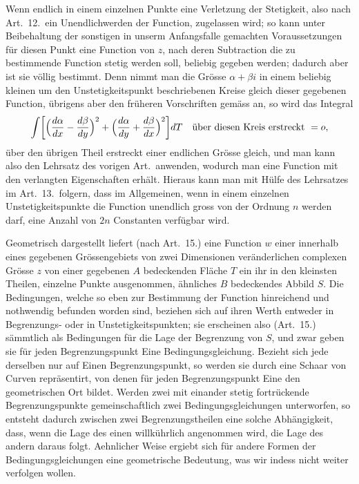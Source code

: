\documentclass{article}
\begin{document}
Wenn endlich in einem einzelnen Punkte eine Verletzung der Stetigkeit, also nach Art.~12.\ ein Unendlichwerden der Function, zugelassen wird; so kann unter Beibehaltung der sonstigen in unserm Anfangsfalle gemachten Voraussetzungen für diesen Punkt eine Function von $z$, nach deren Subtraction die zu bestimmende Function stetig werden soll, beliebig gegeben werden; dadurch aber ist sie völlig bestimmt. Denn nimmt man die Grösse $\alpha + \beta i$ in einem beliebig kleinen um den Unstetigkeitspunkt beschriebenen Kreise gleich dieser gegebenen Function, übrigens aber den früheren Vorschriften gemäss an, so wird das Integral
\[
\int \biggl[\Bigl(\frac{d\alpha}{dx} - \frac{d\beta}{dy}\Bigr)^2 + \Bigl(\frac{d\alpha}{dy} + \frac{d\beta}{dx}\Bigr)^2\biggr] dT \quad \text{über diesen Kreis erstreckt } = o,
\]
über den übrigen Theil erstreckt einer endlichen Grösse gleich, und man kann also den Lehrsatz des vorigen Art.\ anwenden, wodurch man eine Function mit den verlangten Eigenschaften erhält. Hieraus kann man mit Hülfe des Lehrsatzes im Art.~13.\ folgern, dass im Allgemeinen, wenn in einem einzelnen Unstetigkeitspunkte die Function unendlich gross von der Ordnung $n$ werden darf, eine Anzahl von $2n$ Constanten verfügbar wird.

Geometrisch dargestellt liefert (nach Art.~15.) eine Function $w$ einer innerhalb eines gegebenen Grössengebiets von zwei Dimensionen veränderlichen complexen Grösse $z$ von einer gegebenen $A$ bedeckenden Fläche $T$ ein ihr in den kleinsten Theilen, einzelne Punkte ausgenommen, ähnliches $B$ bedeckendes Abbild $S$. Die Bedingungen, welche so eben zur Bestimmung der Function hinreichend und nothwendig befunden worden sind, beziehen sich auf ihren Werth entweder in Begrenzungs- oder in Unstetigkeitspunkten; sie erscheinen also (Art.~15.) sämmtlich als Bedingungen für die Lage der Begrenzung von $S$, und zwar geben sie für jeden Begrenzungspunkt Eine Bedingungsgleichung. Bezieht sich jede derselben nur auf Einen Begrenzungspunkt, so werden sie durch eine Schaar von Curven repräsentirt, von denen für jeden Begrenzungspunkt Eine den geometrischen Ort bildet. Werden zwei mit einander stetig fortrückende Begrenzungspunkte gemeinschaftlich zwei Bedingungsgleichungen unterworfen, so entsteht dadurch zwischen zwei Begrenzungstheilen eine solche Abhängigkeit, dass, wenn die Lage des einen willkührlich angenommen wird, die Lage des andern daraus folgt. Aehnlicher Weise ergiebt sich für andere Formen der Bedingungsgleichungen eine geometrische Bedeutung, was wir indess nicht weiter verfolgen wollen.
\end{document}

